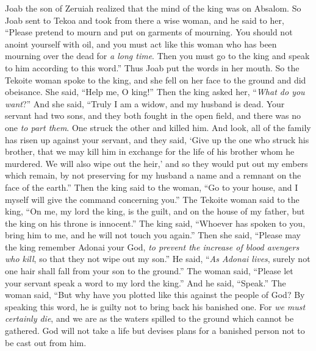 \begin{biblechapter} %
 Joab the son of Zeruiah realized that the mind of the king was on Absalom.
\verse So Joab sent to Tekoa and took from there a wise woman, and he said to her, “Please pretend to mourn and put on garments of mourning. You should not anoint yourself with oil, and you must act like this woman who has been mourning over the dead for \textit{a long time}.
\verse Then you must go to the king and speak to him according to this word.” Thus Joab put the words in her mouth.
\verse So the Tekoite woman spoke to the king, and she fell on her face to the ground and did obeisance. She said, “Help me, O king!”
\verse Then the king asked her, “\textit{What do you want}?” And she said, “Truly I am a widow, and my husband is dead.
\verse Your servant had two sons, and they both fought in the open field, and there was no one \textit{to part them}. One struck the other and killed him.
\verse And look, all of the family has risen up against your servant, and they said, ‘Give up the one who struck his brother, that we may kill him in exchange for the life of his brother whom he murdered. We will also wipe out the heir,’ and so they would put out my embers which remain, by not preserving for my husband a name and a remnant on the face of the earth.”
\verse Then the king said to the woman, “Go to your house, and I myself will give the command concerning you.”
\verse The Tekoite woman said to the king, “On me, my lord the king, is the guilt, and on the house of my father, but the king on his throne is innocent.”
\verse The king said, “Whoever has spoken to you, bring him to me, and he will not touch you again.”
\verse Then she said, “Please may the king remember Adonai your God, \textit{to prevent the increase of blood avengers who kill}, so that they not wipe out my son.” He said, “\textit{As Adonai lives}, surely not one hair shall fall from your son to the ground.”
\verse The woman said, “Please let your servant speak a word to my lord the king.” And he said, “Speak.”
\verse The woman said, “But why have you plotted like this against the people of God? By speaking this word, he is guilty not to bring back his banished one.
\verse For \textit{we must certainly die}, and we are as the waters spilled to the ground which cannot be gathered. God will not take a life but devises plans for a banished person not to be cast out from him.

\end{biblechapter}

